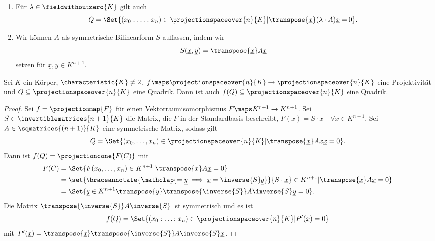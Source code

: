 \begin{bemerkung*}
  \begin{enumerate}
    \item Für \( \lambda\in \fieldwithoutzero{K} \) gilt auch 
    \begin{equation*}
      Q=\Set{(x_0:\dotsc:x_n)\in \projectionspaceover{n}{K}|\transpose{\underline{x}}(\lambda\cdot A)\underline{x}=0}.
    \end{equation*}
    \item Wir können \( A \) als symmetrische Bilinearform \( S \) auffassen, indem wir
    \begin{equation*}
      S(\underline{x},\underline{y})=\transpose{\underline{x}}A\underline{x}
    \end{equation*}
    setzen für \( \underline{x},\underline{y}\in K^{n+1} \).
  \end{enumerate}
\end{bemerkung*}
\begin{lemma}\label{projektivitaet_projektive_quadriken_auf_projektive_quadriken}
  Sei \( K \) ein Körper, \( \characteristic{K}\neq 2 \), \( f\maps \projectionspaceover{n}{K}\to\projectionspaceover{n}{K} \) eine Projektivität und \( Q\subseteq \projectionspaceover{n}{K} \) eine Quadrik. Dann ist auch \( f(Q)\subseteq \projectionspaceover{n}{K} \) eine Quadrik.
\end{lemma}
\begin{proof}
  Sei \( f=\projectionmap{F} \) für einen Vektorraumisomorphismus \( F\maps K^{n+1}\to K^{n+1} \). Sei \( S\in \invertiblematrices{n+1}{K} \) die Matrix, die \( F \) in der Standardbasis beschreibt, \dh \( F(\underline{x})=S\cdot \underline{x}\quad \forall \underline{x}\in K^{n+1} \). Sei \( A\in \sqmatrices{(n+1)}{K} \) eine symmetrische Matrix, sodass gilt
  \begin{equation*}
    Q=\Set{(x_0,\dotsc,x_n)\in \projectionspaceover{n}{K}|\transpose{\underline{x}}Ax\underline{x}=0}.
  \end{equation*}
  Dann ist \( f(Q)=\projectioncone{F(C)} \) mit
  \begin{align*}
    F(C)&=\Set{F(x_0,\dotsc,x_n)\in K^{n+1}|\transpose{x}A\underline{x}=0}\\
    &=\set{\braceannotate{\mathclap{=\underline{y}\implies \underline{x}=\inverse{S}\underline{y}}}{S\cdot\underline{x}}\in K^{n+1}|\transpose{\underline{x}}A\underline{x}=0}\\
    &=\Set{\underline{y}\in K^{n+1}\transpose{y}\transpose{\inverse{S}}A\inverse{S}\underline{y}=0}.
  \end{align*}
  Die Matrix \( \transpose{\inverse{S}}A\inverse{S} \) ist symmetrisch und es ist
  \begin{equation*}
    f(Q)=\Set{(x_0:\dotsc:x_n)\in \projectionspaceover{n}{K}|P'(\underline{x})=0}
  \end{equation*}
  mit \( P'(\underline{x})=\transpose{\underline{x}}\transpose{\inverse{S}}A\inverse{S}\underline{x} \).
\end{proof}
